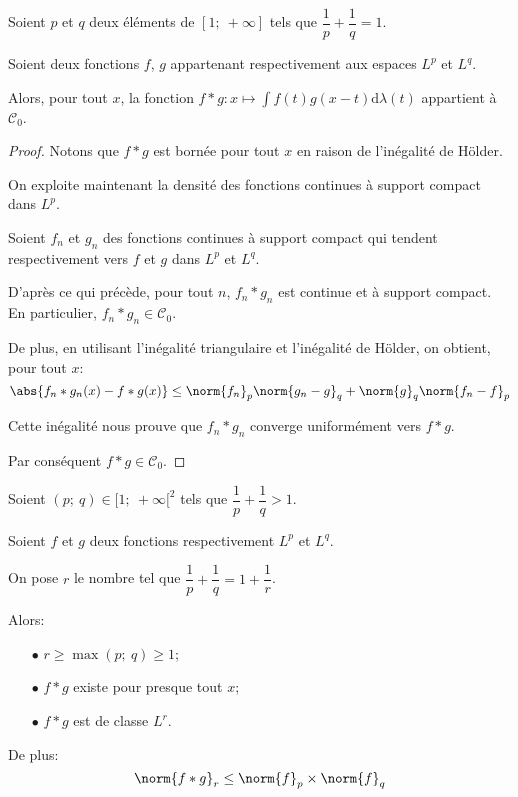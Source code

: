 \begin{de}[Convolution $L^p$ et $L^q$]
Soient $p$ et $q$ deux éléments de $[1;~+\infty]$ tels que $\dfrac{1}{p}+\dfrac{1}{q}=1$.

Soient deux fonctions $f$, $g$ appartenant respectivement aux espaces $L^p$ et $L^q$.

Alors, pour tout $x$, la fonction
$
f*g: x \mapsto \displaystyle{\int} f(t)g(x-t) \mathrm d \lambda(t)
$
appartient à $\mathcal{C}_0$.
\end{de}

\begin{proof}
Notons que $f*g$ est bornée pour tout $x$ en raison de l'inégalité de Hölder.

On exploite maintenant la densité des fonctions continues à support compact dans $L^p$.

Soient $f_n$ et $g_n$ des fonctions continues à support compact qui tendent respectivement vers $f$ et $g$ dans $L^p$ et $L^q$.

D'après ce qui précède, pour tout $n$, $f_n*g_n$ est continue et à support compact. En particulier, $f_n*g_n \in \mathcal{C}_0$.

De plus, en utilisant l'inégalité triangulaire et l'inégalité de Hölder, on obtient, pour tout $x$:
\[
\abs{f_n*g_n(x) - f*g(x)} \leq \norm{f_n}_p\norm{g_n-g}_q+\norm{g}_q \norm{f_n-f}_p
\]

Cette inégalité nous prouve que $f_n*g_n$ converge uniformément vers $f*g$.

Par conséquent $f*g \in \mathcal{C}_0$. 
\end{proof}



\begin{theo}
Soient $(p;~q) \in [1;~+\infty[^2$ tels que $\dfrac{1}{p}+\dfrac{1}{q} > 1$.

Soient $f$ et $g$ deux fonctions respectivement $L^p$ et $L^q$.

On pose $r$ le nombre tel que $\dfrac{1}{p}+\dfrac{1}{q} = 1 + \dfrac{1}{r}$.

Alors:
\begin{itemize}
\item[$\bullet$] $r \geq \max(p;~q) \geq 1$;
\item[$\bullet$] $f*g$ existe pour presque tout $x$;
\item[$\bullet$] $f*g$ est de classe $L^r$.
\end{itemize}

De plus:
\[
\norm{f*g}_r \leq \norm{f}_p \times \norm{f}_q
\]
\end{theo}

